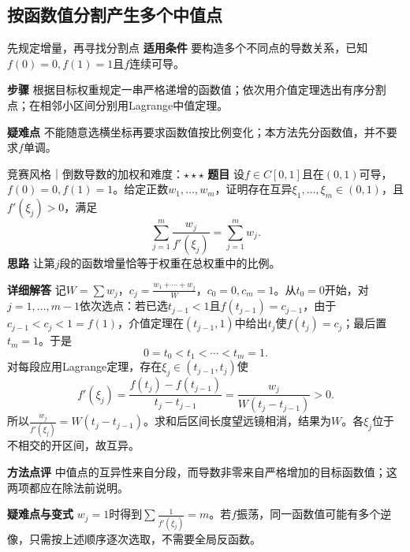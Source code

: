 \subsection{按函数值分割产生多个中值点}
\begin{method}{先规定增量，再寻找分割点}
\textbf{适用条件} 要构造多个不同点的导数关系，已知$f(0)=0,f(1)=1$且$f$连续可导。\par
\textbf{步骤} 根据目标权重规定一串严格递增的函数值；依次用介值定理选出有序分割点；在相邻小区间分别用Lagrange中值定理。\par
\textbf{疑难点} 不能随意选横坐标再要求函数值按比例变化；本方法先分函数值，并不要求$f$单调。
\end{method}
\begin{example}{竞赛风格｜倒数导数的加权和}{难度：$\star\star\star$}\label{cd:ex:weighted-reciprocal}
\textbf{题目} 设$f\in C[0,1]$且在$(0,1)$可导，$f(0)=0,f(1)=1$。给定正数$w_1,\ldots,w_m$，证明存在互异$\xi_1,\ldots,\xi_m\in(0,1)$，且$f'(\xi_j)>0$，满足
\[
 \sum_{j=1}^m\dfrac{w_j}{f'(\xi_j)}
 =\sum_{j=1}^mw_j.
\]
\textbf{思路} 让第$j$段的函数增量恰等于权重在总权重中的比例。\par
\textbf{详细解答} 记$W=\sum w_j$，$c_j=\frac{w_1+\cdots+w_j}{W}$，$c_0=0,c_m=1$。从$t_0=0$开始，对$j=1,\ldots,m-1$依次选点：若已选$t_{j-1}<1$且$f(t_{j-1})=c_{j-1}$，由于$c_{j-1}<c_j<1=f(1)$，介值定理在$(t_{j-1},1)$中给出$t_j$使$f(t_j)=c_j$；最后置$t_m=1$。于是
\[
 0=t_0<t_1<\cdots<t_m=1.
\]
对每段应用Lagrange定理，存在$\xi_j\in(t_{j-1},t_j)$使
\[
 f'(\xi_j)=\dfrac{f(t_j)-f(t_{j-1})}{t_j-t_{j-1}}
 =\dfrac{w_j}{W(t_j-t_{j-1})}>0.
\]
所以$\frac{w_j}{f'(\xi_j)}=W(t_j-t_{j-1})$。求和后区间长度望远镜相消，结果为$W$。各$\xi_j$位于不相交的开区间，故互异。\par
\textbf{方法点评} 中值点的互异性来自分段，而导数非零来自严格增加的目标函数值；这两项都应在除法前说明。\par
\textbf{疑难点与变式} $w_j=1$时得到$\sum\frac{1}{f'(\xi_j)}=m$。若$f$振荡，同一函数值可能有多个逆像，只需按上述顺序逐次选取，不需要全局反函数。
\end{example}

